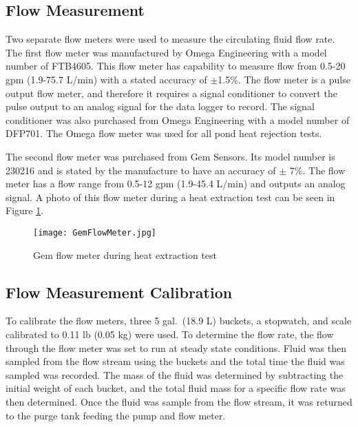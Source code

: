 	\subsection{Flow Measurement}
	\label{subsec:ExpMethod:Instr:Flow}

Two separate flow meters were used to measure the circulating fluid flow rate. The first flow meter was manufactured by Omega Engineering with a model number of FTB4605. This flow meter has capability to measure flow from 0.5-20 gpm (1.9-75.7 L/min) with a stated accuracy of $\pm$1.5\%. The flow meter is a pulse output flow meter, and therefore it requires a signal conditioner to convert the pulse output to an analog signal for the data logger to record. The signal conditioner was also purchased from Omega Engineering with a model number of DFP701. The Omega flow meter was used for all pond heat rejection tests.

The second flow meter was purchased from Gem Sensors. Its model number is 230216 and is stated by the manufacture to have an accuracy of $\pm$ 7\%. The flow meter has a flow range from 0.5-12 gpm (1.9-45.4 L/min) and outputs an analog signal. A photo of this flow meter during a heat extraction test can be seen in Figure \ref{fig:ExpMethod:Instr:Flow:GemFlowMeter}.

\begin{figure}
	\centering
	\texttt{[image: GemFlowMeter.jpg]}
	\caption[Gem flow meter]{Gem flow meter during heat extraction test}
	\label{fig:ExpMethod:Instr:Flow:GemFlowMeter}
\end{figure}

	\subsection{Flow Measurement Calibration}
	\label{subsec:ExpMethod:Instr:FlowCal}

To calibrate the flow meters, three 5 gal.\ (18.9 L) buckets, a stopwatch, and scale calibrated to 0.11 lb (0.05 kg) were used. To determine the flow rate, the flow through the flow meter was set to run at steady state conditions. Fluid was then sampled from the flow stream using the buckets and the total time the fluid was sampled was recorded. The mass of the fluid was determined by subtracting the initial weight of each bucket, and the total fluid mass for a specific flow rate was then determined. Once the fluid was sample from the flow stream, it was returned to the purge tank feeding the pump and flow meter.

